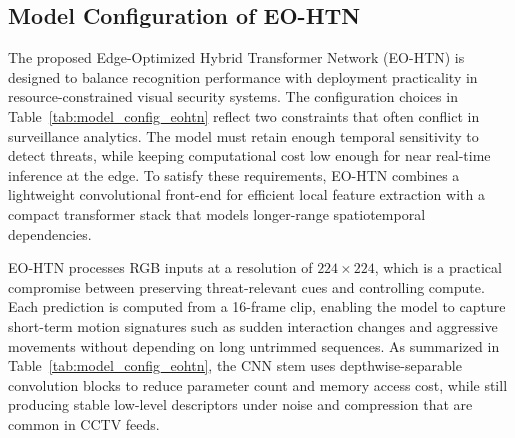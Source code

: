 \documentclass[AMA,Times1COL]{WileyNJDv5} %
\begin{document}
\begin{table}[t]
\centering
\caption{Dataset-wise data split used in experiments.}
\label{tab:data_split_threat}
\renewcommand{\arraystretch}{1.1}
\setlength{\tabcolsep}{3.5pt}
\end{table}


\subsection{Model Configuration of EO-HTN}
The proposed Edge-Optimized Hybrid Transformer Network (EO-HTN) is designed to balance recognition performance with deployment practicality in resource-constrained visual security systems. The configuration choices in Table~\ref{tab:model_config_eohtn} reflect two constraints that often conflict in surveillance analytics. The model must retain enough temporal sensitivity to detect threats, while keeping computational cost low enough for near real-time inference at the edge. To satisfy these requirements, EO-HTN combines a lightweight convolutional front-end for efficient local feature extraction with a compact transformer stack that models longer-range spatiotemporal dependencies.

EO-HTN processes RGB inputs at a resolution of $224 \times 224$, which is a practical compromise between preserving threat-relevant cues and controlling compute. Each prediction is computed from a 16-frame clip, enabling the model to capture short-term motion signatures such as sudden interaction changes and aggressive movements without depending on long untrimmed sequences. As summarized in Table~\ref{tab:model_config_eohtn}, the CNN stem uses depthwise-separable convolution blocks to reduce parameter count and memory access cost, while still producing stable low-level descriptors under noise and compression that are common in CCTV feeds.
\end{document}
